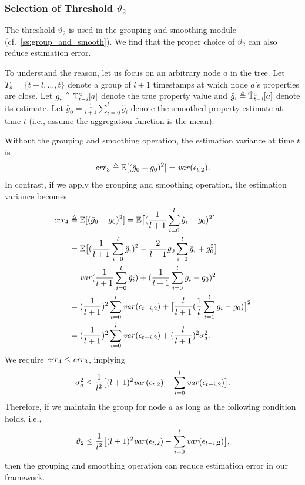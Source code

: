 
\subsubsection{Selection of Threshold $\vartheta_2$}

The threshold $\vartheta_2$ is used in the grouping and smoothing module
(cf.~\cref{ss:group_and_smooth}).
We find that the proper choice of $\vartheta_2$ can also reduce estimation error.

To understand the reason, let us focus on an arbitrary node $a$ in the tree.
Let $T_a=\{t-l,\ldots,t\}$ denote a group of $l+1$ timestamps at which node
$a$'s properties are close.
Let $g_i\triangleq\mathbb{T}^a_{t-i}[a]$ denote the true property value and
$\hat{g}_i\triangleq\hat{\mathbb{T}}^a_{t-i}[a]$ denote its estimate.
Let $\bar{g}_0=\frac{1}{l+1}\sum_{i=0}^{l}\hat{g}_i$ denote the smoothed
property estimate at time $t$ (i.e., assume the aggregation function is the mean).

Without the grouping and smoothing operation, the estimation variance at time $t$
is
\[
  \mathit{err}_3 \triangleq \mathbb{E}[(\hat{g}_0-g_0)^2] = \mathit{var}(\epsilon_{t,2}).
\]
In contrast, if we apply the grouping and smoothing operation, the estimation
variance becomes
\begin{align*}
  \mathit{err}_4
  &\triangleq \mathbb{E}[(\bar{g}_0-g_0)^2]
    = \mathbb{E}\big[(\frac{1}{l+1}\sum_{i=0}^l\hat{g}_i - g_0)^2\big] \\
  &= \mathbb{E}\big[(\frac{1}{l+1}\sum_{i=0}^l\hat{g}_i)^2
    -\frac{2}{l+1}g_0\sum_{i=0}^l\hat{g}_i  + g_0^2\big] \\
  &= \mathit{var}(\frac{1}{l+1}\sum_{i=0}^l\hat{g}_i)
    + (\frac{1}{l+1}\sum_{i=0}^lg_i - g_0)^2 \\
  &= (\frac{1}{l+1})^2\sum_{i=0}^l\mathit{var}(\epsilon_{t-i,2})
    + \big[\frac{l}{l+1}(\frac{1}{l}\sum_{i=1}^lg_i - g_0)\big]^2 \\
  &= (\frac{1}{l+1})^2\sum_{i=0}^l\mathit{var}(\epsilon_{t-i,2})
    + (\frac{l}{l+1})^2\sigma_a^2.
\end{align*}
We require $\mathit{err}_4\le\mathit{err}_3$, implying
\[
  \sigma_a^2\leq\frac{1}{l^2}\big[ (l+1)^2\mathit{var}(\epsilon_{t,2})
  -\sum_{i=0}^l\mathit{var}(\epsilon_{t-i,2})\big].
\]
Therefore, if we maintain the group for node $a$ as long as the following condition holds, i.e.,
\begin{equation}\label{eq:theta2}
  \vartheta_2
  \leq\frac{1}{l^2}\big[ (l+1)^2\mathit{var}(\epsilon_{t,2})
  -\sum_{i=0}^l\mathit{var}(\epsilon_{t-i,2})\big],
\end{equation}
then the grouping and smoothing operation can reduce estimation error in our
framework.

